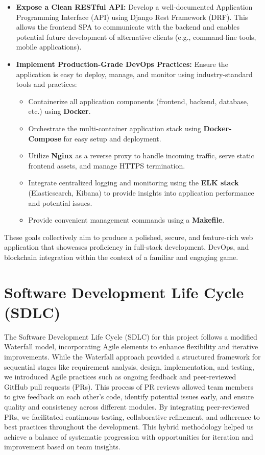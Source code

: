 \begin{itemize}
    \item \textbf{Expose a Clean RESTful API:} Develop a well-documented Application Programming Interface (API) using Django Rest Framework (DRF). This allows the frontend SPA to communicate with the backend and enables potential future development of alternative clients (e.g., command-line tools, mobile applications).
    
    \item \textbf{Implement Production-Grade DevOps Practices:} Ensure the application is easy to deploy, manage, and monitor using industry-standard tools and practices:
    \begin{itemize}
        \item Containerize all application components (frontend, backend, database, etc.) using \textbf{Docker}.
        \item Orchestrate the multi-container application stack using \textbf{Docker-Compose} for easy setup and deployment.
        \item Utilize \textbf{Nginx} as a reverse proxy to handle incoming traffic, serve static frontend assets, and manage HTTPS termination.
        \item Integrate centralized logging and monitoring using the \textbf{ELK stack} (Elasticsearch, Kibana) to provide insights into application performance and potential issues.
        \item Provide convenient management commands using a \textbf{Makefile}.
    \end{itemize}
\end{itemize}

These goals collectively aim to produce a polished, secure, and feature-rich web application that showcases proficiency in full-stack development, DevOps, and blockchain integration within the context of a familiar and engaging game.

\chapter{Software Development Life Cycle (SDLC)} 

The Software Development Life Cycle (SDLC) for this project follows a modified Waterfall model, incorporating Agile elements to enhance flexibility and iterative improvements. While the Waterfall approach provided a structured framework for sequential stages like requirement analysis, design, implementation, and testing, we introduced Agile practices such as ongoing feedback and peer-reviewed GitHub pull requests (PRs). This process of PR reviews allowed team members to give feedback on each other's code, identify potential issues early, and ensure quality and consistency across different modules. By integrating peer-reviewed PRs, we facilitated continuous testing, collaborative refinement, and adherence to best practices throughout the development. This hybrid methodology helped us achieve a balance of systematic progression with opportunities for iteration and improvement based on team insights.

